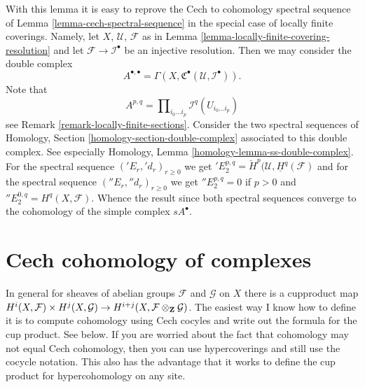 \noindent
With this lemma it is easy to reprove the Cech to cohomology spectral
sequence of Lemma \ref{lemma-cech-spectral-sequence} in the special
case of locally finite coverings. Namely,
let $X$, $\mathcal{U}$, $\mathcal{F}$ as in
Lemma \ref{lemma-locally-finite-covering-resolution}
and let $\mathcal{F} \to \mathcal{I}^\bullet$ be an injective resolution.
Then we may consider the double complex
$$
A^{\bullet, \bullet} =
\Gamma(X, {\mathfrak C}^\bullet(\mathcal{U}, \mathcal{I}^\bullet)).
$$
Note that
$$
A^{p, q} = \prod\nolimits_{i_0 \ldots i_p} \mathcal{I}^q(U_{i_0 \ldots i_p})
$$
see Remark \ref{remark-locally-finite-sections}.
Consider the two spectral sequences of
Homology, Section \ref{homology-section-double-complex} associated
to this double complex.
See especially Homology, Lemma \ref{homology-lemma-ss-double-complex}.
For the spectral sequence $({}'E_r, {}'d_r)_{r \geq 0}$
we get ${}'E_2^{p, q} = \check{H}^p(\mathcal{U}, \underline{H}^q(\mathcal{F})$
and for the spectral sequence $({}''E_r, {}''d_r)_{r \geq 0}$ we get
${}''E_2^{p, q} = 0$ if $p > 0$ and ${}''E_2^{0, q} = H^q(X, \mathcal{F})$.
Whence the result since both spectral sequences converge to the
cohomology of the simple complex $sA^\bullet$.












\section{Cech cohomology of complexes}
\label{section-cech-cohomology-of-complexes}

\noindent
In general for sheaves of abelian groups
${\mathcal F}$ and ${\mathcal G}$ on $X$ there is a cupproduct map
$H^i(X, {\mathcal F}) \times H^j(X, {\mathcal G}) \to
H^{i + j}(X, {\mathcal F}\otimes_{\bf Z} {\mathcal G})$. The easiest way
I know how to define it is to compute cohomology using Cech
cocyles and write out the formula for the cup product. See below.
If you are worried about the fact that cohomology may not
equal Cech cohomology, then you can use hypercoverings and still
use the cocycle notation. This also has the advantage that
it works to define the cup product for hypercohomology on any site.

